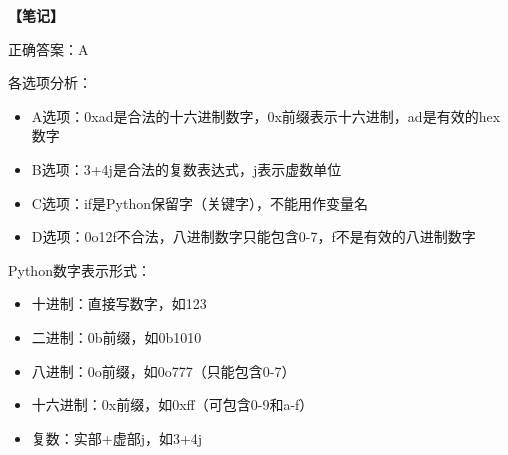 \begin{mdframed}[linewidth=1pt, linecolor=black]

  \textbf{\color{red}【笔记】}

  正确答案：A

  各选项分析：
  \begin{itemize}
    \item A选项：0xad是合法的十六进制数字，0x前缀表示十六进制，ad是有效的hex数字
    \item B选项：3+4j是合法的复数表达式，j表示虚数单位
    \item C选项：if是Python保留字（关键字），不能用作变量名
    \item D选项：0o12f不合法，八进制数字只能包含0-7，f不是有效的八进制数字
  \end{itemize}

  Python数字表示形式：
  \begin{itemize}
    \item 十进制：直接写数字，如123
    \item 二进制：0b前缀，如0b1010
    \item 八进制：0o前缀，如0o777（只能包含0-7）
    \item 十六进制：0x前缀，如0xff（可包含0-9和a-f）
    \item 复数：实部+虚部j，如3+4j
  \end{itemize}

\end{mdframed}